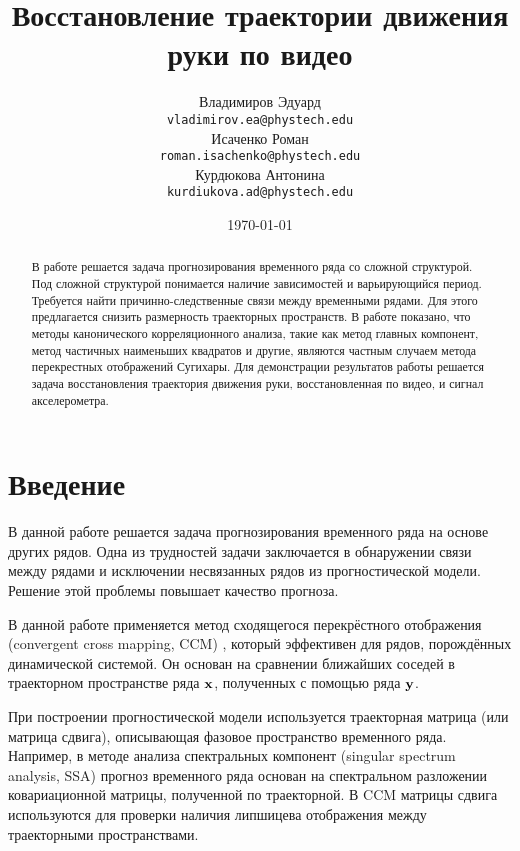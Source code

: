 \documentclass[a4paper, 12pt]{article}
\title{Восстановление траектории движения руки по видео}
\author{Владимиров Эдуард \\
	\texttt{vladimirov.ea@phystech.edu} \\

	\And
	Исаченко Роман \\
	\texttt{roman.isachenko@phystech.edu} \\
	
	\And
	Курдюкова Антонина \\
	\texttt{kurdiukova.ad@phystech.edu} \\
}
\date{\today}
\begin{document}
\maketitle

\begin{abstract}
	В работе решается задача прогнозирования временного ряда со сложной структурой. Под сложной структурой понимается наличие зависимостей и варьирующийся период. Требуется найти причинно-следственные связи между временными рядами. Для этого предлагается снизить размерность траекторных пространств. В работе показано, что методы канонического корреляционного анализа, такие как метод главных компонент, метод частичных наименьших квадратов и другие, являются частным случаем метода перекрестных отображений Сугихары. Для демонстрации результатов работы решается задача восстановления траектория движения руки, восстановленная по видео, и сигнал акселерометра.
\end{abstract}



\section{Введение}

В данной работе решается задача прогнозирования временного ряда на основе других рядов. 
Одна из трудностей задачи заключается в обнаружении связи между рядами и исключении несвязанных рядов из прогностической модели. 
Решение этой проблемы повышает качество прогноза.

В данной работе применяется метод сходящегося перекрёстного отображения (convergent cross mapping, CCM) \citep{Sugihara90, sugihara1990nonlinear}, который эффективен для рядов, порождённых динамической системой. 
Он основан на сравнении ближайших соседей в траекторном пространстве ряда $\mathbf{x}$, полученных с помощью ряда $\mathbf{y}$.

При построении прогностической модели используется траекторная матрица (или матрица сдвига), описывающая фазовое пространство временного ряда. 
Например, в методе анализа спектральных компонент (singular spectrum analysis, SSA) \citep{golyandina2005ssa, golyandina2001analysis, zhigljavsky2010singular} прогноз временного ряда основан на спектральном разложении ковариационной матрицы, полученной по траекторной. 
В CCM матрицы сдвига используются для проверки наличия липшицева отображения между траекторными пространствами.
\end{document}
